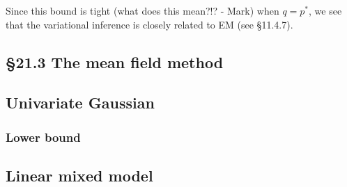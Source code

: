 \documentclass{amsart}
\begin{document}
Since this bound is tight (what does this mean?!? - Mark) when $q=p^{*}$, we see that the
variational inference is closely related to EM (see \S 11.4.7).


\subsection{\S 21.3 The mean field method}

\subsection{Univariate Gaussian}

\subsubsection{Lower bound}

\subsection{Linear mixed model}
\end{document}
